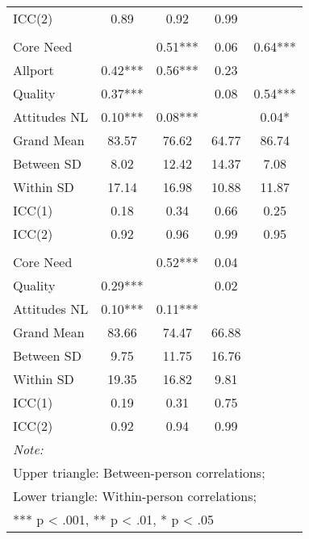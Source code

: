 \begin{table}
\begin{minipage}[t][\textheight][t]{\textwidth}
{\begin{tabular}[t]{lcccc}
\hspace{1em}ICC(2) & 0.89 & 0.92 & 0.99 & \\
\addlinespace[0.3em]
\multicolumn{5}{l}{\textbf{Study 3}}\\
\hspace{1em}Core Need &  & 0.51*** & 0.06 & 0.64***\\
\hspace{1em}Allport & 0.42*** & 0.56*** & 0.23 & \\
\hspace{1em}Quality & 0.37*** &  & 0.08 & 0.54***\\
\hspace{1em}Attitudes NL & 0.10*** & 0.08*** &  & 0.04*\\
\addlinespace
\hspace{1em}Grand Mean & 83.57 & 76.62 & 64.77 & 86.74\\
\hspace{1em}Between SD & 8.02 & 12.42 & 14.37 & 7.08\\
\hspace{1em}Within SD & 17.14 & 16.98 & 10.88 & 11.87\\
\hspace{1em}ICC(1) & 0.18 & 0.34 & 0.66 & 0.25\\
\hspace{1em}ICC(2) & 0.92 & 0.96 & 0.99 & 0.95\\
\addlinespace[0.3em]
\multicolumn{5}{l}{\textbf{Across Studies}}\\
\hspace{1em}Core Need &  & 0.52*** & 0.04 & \\
\hspace{1em}Quality & 0.29*** &  & 0.02 & \\
\hspace{1em}Attitudes NL & 0.10*** & 0.11*** &  & \\
\addlinespace
\hspace{1em}Grand Mean & 83.66 & 74.47 & 66.88 & \\
\hspace{1em}Between SD & 9.75 & 11.75 & 16.76 & \\
\hspace{1em}Within SD & 19.35 & 16.82 & 9.81 & \\
\hspace{1em}ICC(1) & 0.19 & 0.31 & 0.75 & \\
\hspace{1em}ICC(2) & 0.92 & 0.94 & 0.99 & \\
\bottomrule
\multicolumn{5}{l}{\rule{0pt}{1em}\textit{Note: }}\\
\multicolumn{5}{l}{\rule{0pt}{1em}Upper triangle: Between-person correlations;}\\
\multicolumn{5}{l}{\rule{0pt}{1em}Lower triangle: Within-person correlations;}\\
\multicolumn{5}{l}{\rule{0pt}{1em}*** p < .001, ** p < .01,  * p < .05}\\
\end{tabular}}
\end{minipage}
\end{table}

